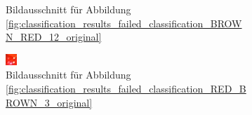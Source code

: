 \begin{figure}[h]
\begin{subfigure}[t]{0.2\textwidth}
                \caption{Bildausschnitt für Abbildung \ref{fig:classification_results_failed_classification_BROWN_RED_12_original}}
                \label{fig:classification_results_failed_classification_BROWN_RED_12_roi}
        \end{subfigure}
        \hfill
        \begin{subfigure}[t]{0.2\textwidth}
                \raggedright
                \includegraphics[width=1.0\linewidth]{../common/04_results/resources/classification/failed_classification_RED_BROWN_3_roi.png}
                \caption{Bildausschnitt für Abbildung \ref{fig:classification_results_failed_classification_RED_BROWN_3_original}}
                \label{fig:classification_results_failed_classification_RED_BROWN_3_roi}
        \end{subfigure}
        \hfill
        \begin{subfigure}[t]{0.2\textwidth}
                \raggedright

\end{subfigure}
\end{figure}
